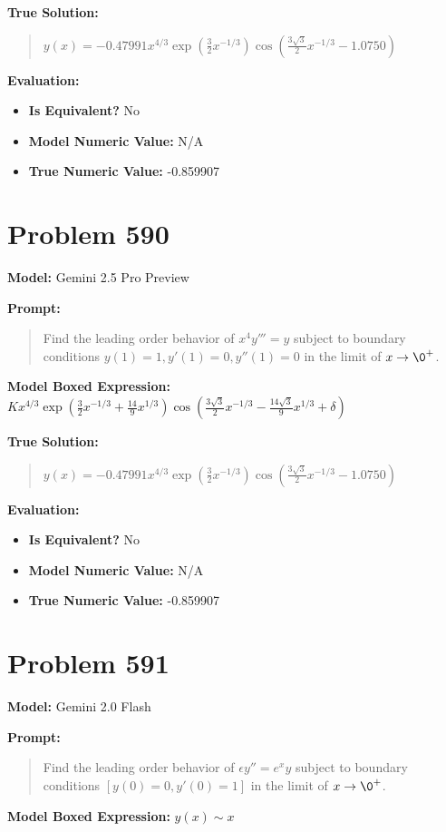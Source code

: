 \documentclass{article}
\begin{document}
\textbf{True Solution:}
\begin{quote}
$y(x) =-0.47991x^{4/3}\exp{\left( \frac{3}{2} x^{-1/3} \right)}\cos\left( \frac{3\sqrt{3}}{2} x^{-1/3} -1.0750 \right)$
\end{quote}

\textbf{Evaluation:}
\begin{itemize}
\item \textbf{Is Equivalent?} No
\item \textbf{Model Numeric Value:} N/A
\item \textbf{True Numeric Value:} -0.859907
\end{itemize}
\vspace{1cm}
\section*{Problem 590}
\textbf{Model:} Gemini 2.5 Pro Preview

\textbf{Prompt:}
\begin{quote}
Find the leading order behavior of $x^4y'''=y$ subject to boundary conditions $y(1)=1,y'(1)=0,y''(1)=0$ in the limit of $x\to\0^+$.
\end{quote}
\textbf{Model Boxed Expression:} $K x^{4/3} \exp\left(\frac{3}{2}x^{-1/3} + \frac{14}{9}x^{1/3}\right) \cos\left(\frac{3\sqrt{3}}{2}x^{-1/3} - \frac{14\sqrt{3}}{9}x^{1/3} + \delta\right)$

\textbf{True Solution:}
\begin{quote}
$y(x) =-0.47991x^{4/3}\exp{\left( \frac{3}{2} x^{-1/3} \right)}\cos\left( \frac{3\sqrt{3}}{2} x^{-1/3} -1.0750 \right)$
\end{quote}

\textbf{Evaluation:}
\begin{itemize}
\item \textbf{Is Equivalent?} No
\item \textbf{Model Numeric Value:} N/A
\item \textbf{True Numeric Value:} -0.859907
\end{itemize}
\vspace{1cm}
\section*{Problem 591}
\textbf{Model:} Gemini 2.0 Flash

\textbf{Prompt:}
\begin{quote}
Find the leading order behavior of $\epsilon y'' = e^xy$ subject to boundary conditions $[y(0) = 0, y'(0) = 1]$ in the limit of $x\to\0^+$.
\end{quote}
\textbf{Model Boxed Expression:} $y(x) \sim x$
\end{document}
